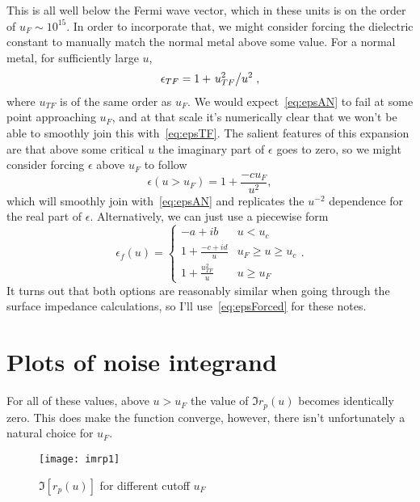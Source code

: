 \documentclass[11pt]{article}
\begin{document}
	This is all well below the Fermi wave vector, which in these units is on the order of $u_F \sim 10^{15}$. 
	In order to incorporate that, we might consider forcing the dielectric constant to manually match the normal metal above some value.
	For a normal metal, for sufficiently large $u$,
	\begin{equation}
		\epsilon_{TF} = 1 + \flatfrac{u_{TF}^2}{u^2} \label{eq:epsTF},
	\end{equation}
	where $u_{TF}$ is of the same order as $u_F$.
	We would expect~\eqref{eq:epsAN} to fail at some point approaching $u_F$, and at that scale it's numerically clear that we won't be able to smoothly join this with~\eqref{eq:epsTF}.
	The salient features of this expansion are that above some critical $u$ the imaginary part of $\epsilon$ goes to zero, so we might consider forcing $\epsilon$ above $u_F$ to follow
	\begin{equation}
		\epsilon(u > u_F) = 1 + \frac{-c u_F}{u^2}, \label{eq:epsSmoothJoin}
	\end{equation}
	which will smoothly join with~\eqref{eq:epsAN} and replicates the $u^{-2}$ dependence for the real part of $\epsilon$.
	Alternatively, we can just use a piecewise form
	\begin{equation}
		\epsilon_f(u) =
		\begin{cases}
			-a + i b & u < u_c \\
			1 + \frac{-c + i d}{u} &  u_F \geq u \geq u_c \\
			1 + \frac{u_{TF}^2}{u} &  u \geq u_F
		\end{cases}. \label{eq:epsForced}
	\end{equation}
	It turns out that both options are reasonably similar when going through the surface impedance calculations, so I'll use~\eqref{eq:epsForced} for these notes.

	\section{Plots of noise integrand} \label{sec:plotsdiscussion}

	For all of these values, above $u > u_F$ the value of $\Im r_p(u)$ becomes identically zero.
	This does make the function converge, however, there isn't unfortunately a natural choice for $u_F$.
	\begin{figure}[htp]
		\centering
		\texttt{[image: imrp1]}
		\caption{$\Im[r_p(u)]$ for different cutoff $u_F$} \label{fig:imrpVsCutoff}
	\end{figure}
\end{document}
